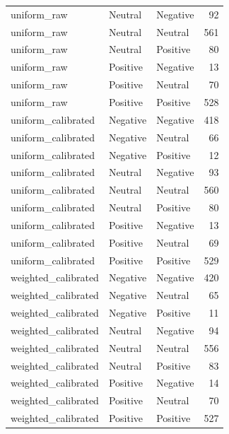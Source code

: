 \begin{tabular}{lllr}
uniform\_raw & Neutral & Negative & 92 \\
uniform\_raw & Neutral & Neutral & 561 \\
uniform\_raw & Neutral & Positive & 80 \\
uniform\_raw & Positive & Negative & 13 \\
uniform\_raw & Positive & Neutral & 70 \\
uniform\_raw & Positive & Positive & 528 \\
uniform\_calibrated & Negative & Negative & 418 \\
uniform\_calibrated & Negative & Neutral & 66 \\
uniform\_calibrated & Negative & Positive & 12 \\
uniform\_calibrated & Neutral & Negative & 93 \\
uniform\_calibrated & Neutral & Neutral & 560 \\
uniform\_calibrated & Neutral & Positive & 80 \\
uniform\_calibrated & Positive & Negative & 13 \\
uniform\_calibrated & Positive & Neutral & 69 \\
uniform\_calibrated & Positive & Positive & 529 \\
weighted\_calibrated & Negative & Negative & 420 \\
weighted\_calibrated & Negative & Neutral & 65 \\
weighted\_calibrated & Negative & Positive & 11 \\
weighted\_calibrated & Neutral & Negative & 94 \\
weighted\_calibrated & Neutral & Neutral & 556 \\
weighted\_calibrated & Neutral & Positive & 83 \\
weighted\_calibrated & Positive & Negative & 14 \\
weighted\_calibrated & Positive & Neutral & 70 \\
weighted\_calibrated & Positive & Positive & 527 \\
\bottomrule
\end{tabular}
